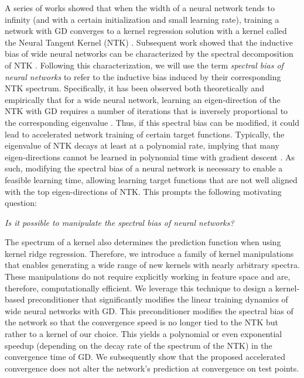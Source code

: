 \documentclass[10pt]{article} %
\theoremstyle{plain}
\theoremstyle{definition}
\theoremstyle{remark}
\begin{document}
A series of works showed that when the width of a neural network tends to infinity (and with a certain initialization and small learning rate), training a network with GD converges to a kernel regression solution with a kernel called the Neural Tangent Kernel (NTK) \citep{jacot2018neural, lee2019wide, allen-zhu2019, chizat2019lazy}. Subsequent work showed that the inductive bias of wide neural networks can be characterized by the spectral decomposition of NTK \citep{arora2019fine, basri2019convergence, yang2019fine}. Following this characterization, we will use the term \emph{spectral bias of neural networks} to refer to the inductive bias induced by their corresponding NTK spectrum. Specifically, it has been observed both theoretically and empirically that for a wide neural network, learning an eigen-direction of the NTK with GD requires a number of iterations that is inversely proportional to the corresponding eigenvalue \citep{bowman2022spectral, fridovich2021spectral, xu2022overview}. Thus, if this spectral bias can be modified, it could lead to accelerated network training of certain target functions. Typically, the eigenvalue of NTK decays at least at a polynomial rate, implying that many eigen-directions cannot be learned in polynomial time with gradient descent \citep{ma2017diving}. As such, modifying the spectral bias of a neural network is necessary to enable a feasible learning time, allowing learning target functions that are not well aligned with the top eigen-directions of NTK. This prompts the following motivating question:
\begin{center}
\emph{Is it possible to manipulate the spectral bias of neural networks?}
\end{center}

The spectrum of a kernel also determines the prediction function when using kernel ridge regression. Therefore, we introduce a family of kernel manipulations that enables generating a wide range of new kernels with nearly arbitrary spectra. These manipulations do not require explicitly working in feature space and are, therefore, computationally efficient.
We leverage this technique to design a kernel-based preconditioner that significantly modifies the linear training dynamics of wide neural networks with GD. This preconditioner modifies the spectral bias of the network so that the convergence speed is no longer tied to the NTK but rather to a kernel of our choice. This yields a polynomial or even exponential speedup (depending on the decay rate of the spectrum of the NTK) in the convergence time of GD. We subsequently show that the proposed accelerated convergence does not alter the network's prediction at convergence on test points.
\end{document}
